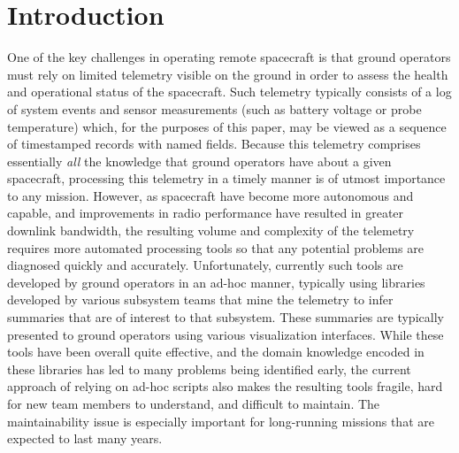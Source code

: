 
\section{Introduction}
\label{sec:introduction}





One of the key challenges in operating remote spacecraft is that
ground operators must rely on limited telemetry visible on the ground
in order to assess the health and operational status of the
spacecraft.  Such telemetry typically consists of a log of system
events and sensor measurements (such as battery voltage or probe
temperature) which, for the purposes of this paper, may be viewed as a
sequence of timestamped records with named fields.  Because this
telemetry comprises essentially {\em all} the knowledge that ground
operators have about a given spacecraft, processing this telemetry in
a timely manner is of utmost importance to any mission.  However, as
spacecraft have become more autonomous and capable, and improvements
in radio performance have resulted in greater downlink bandwidth, the
resulting volume and complexity of the telemetry requires more
automated processing tools so that any potential problems are
diagnosed quickly and accurately.  Unfortunately, currently such tools
are developed by ground operators in an ad-hoc manner, typically using
libraries developed by various subsystem teams that mine the telemetry
to infer summaries that are of interest to that subsystem.  These
summaries are typically presented to ground operators using various
visualization interfaces.  While these tools have been overall quite
effective, and the domain knowledge encoded in these libraries
has led to many problems being identified
early, the current approach of relying on ad-hoc scripts
also makes the resulting tools fragile, hard for new team members to
understand, and difficult to maintain.  The maintainability issue is
especially important for long-running missions that are expected to
last many years.

